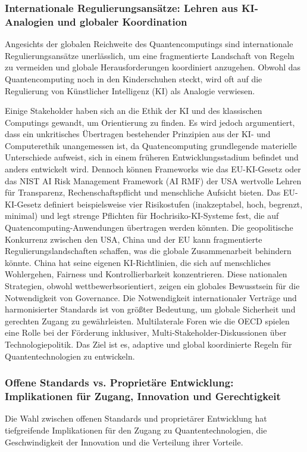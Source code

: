 \subsubsection{\textbf{Internationale Regulierungsansätze: Lehren aus KI-Analogien und globaler Koordination}}
Angesichts der globalen Reichweite des Quantencomputings sind internationale Regulierungsansätze unerlässlich, um eine fragmentierte Landschaft von Regeln zu vermeiden und globale Herausforderungen koordiniert anzugehen. Obwohl das Quantencomputing noch in den Kinderschuhen steckt, wird oft auf die Regulierung von Künstlicher Intelligenz (KI) als Analogie verwiesen.

Einige Stakeholder haben sich an die Ethik der KI und des klassischen Computings gewandt, um Orientierung zu finden. Es wird jedoch argumentiert, dass ein unkritisches Übertragen bestehender Prinzipien aus der KI- und Computerethik unangemessen ist, da Quatencomputing grundlegende materielle Unterschiede aufweist, sich in einem früheren Entwicklungsstadium befindet und anders entwickelt wird.\cite{noauthor_pdf_2025} Dennoch können Frameworks wie das EU-KI-Gesetz oder das NIST AI Risk Management Framework (AI RMF) der USA wertvolle Lehren für Transparenz, Rechenschaftspflicht und menschliche Aufsicht bieten.\cite{noauthor_nist_nodate}\cite{noauthor_ai_2025} Das EU-KI-Gesetz definiert beispielsweise vier Risikostufen (inakzeptabel, hoch, begrenzt, minimal) und legt strenge Pflichten für Hochrisiko-KI-Systeme fest, die auf Quatencomputing-Anwendungen übertragen werden könnten.\cite{noauthor_ai_2025} Die geopolitische Konkurrenz zwischen den USA, China und der EU kann fragmentierte Regulierungslandschaften schaffen, was die globale Zusammenarbeit behindern könnte.\cite{noauthor_europes_2025} China hat seine eigenen KI-Richtlinien, die sich auf menschliches Wohlergehen, Fairness und Kontrollierbarkeit konzentrieren.\cite{noauthor_ethical_nodate} Diese nationalen Strategien, obwohl wettbewerbsorientiert, zeigen ein globales Bewusstsein für die Notwendigkeit von Governance. Die Notwendigkeit internationaler Verträge und harmonisierter Standards ist von größter Bedeutung, um globale Sicherheit und gerechten Zugang zu gewährleisten. Multilaterale Foren wie die OECD spielen eine Rolle bei der Förderung inklusiver, Multi-Stakeholder-Diskussionen über Technologiepolitik.\cite{noauthor_quantum_nodate-7} Das Ziel ist es, adaptive und global koordinierte Regeln für Quantentechnologien zu entwickeln.

\subsubsection{\textbf{Offene Standards vs. Proprietäre Entwicklung: Implikationen für Zugang, Innovation und Gerechtigkeit}}
Die Wahl zwischen offenen Standards und proprietärer Entwicklung hat tiefgreifende Implikationen für den Zugang zu Quantentechnologien, die Geschwindigkeit der Innovation und die Verteilung ihrer Vorteile.

